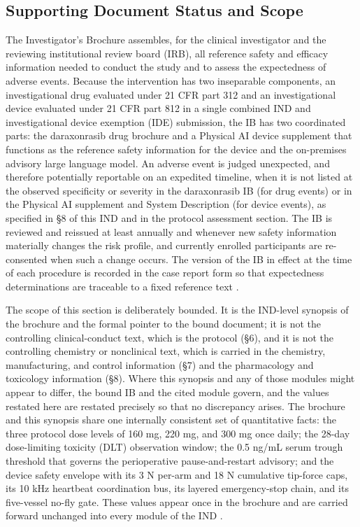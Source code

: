 \subsection*{Supporting Document Status and Scope}

The Investigator's Brochure assembles, for the clinical investigator and the
reviewing institutional review board (IRB), all reference safety and efficacy
information needed to conduct the study and to assess the expectedness of adverse
events. Because the intervention has two inseparable components, an investigational
drug evaluated under 21 CFR part 312 and an investigational device evaluated under
21 CFR part 812 in a single combined IND and investigational device exemption (IDE)
submission, the IB has two coordinated parts: the daraxonrasib drug brochure and a
Physical AI device supplement that functions as the reference safety information for
the device and the on-premises advisory large language model. An adverse event is
judged unexpected, and therefore potentially reportable on an expedited timeline,
when it is not listed at the observed specificity or severity in the daraxonrasib
IB (for drug events) or in the Physical AI supplement and System Description (for
device events), as specified in \S 8 of this IND and in the protocol assessment
section. The IB is reviewed and reissued at least annually and whenever new safety
information materially changes the risk profile, and currently enrolled
participants are re-consented when such a change occurs. The version of the IB in
effect at the time of each procedure is recorded in the case report form so that
expectedness determinations are traceable to a fixed reference text
\cite{daraxwhipple,cfr312paiuni}.

The scope of this section is deliberately bounded. It is the IND-level synopsis
of the brochure and the formal pointer to the bound document; it is not the
controlling clinical-conduct text, which is the protocol (\S 6), and it is not the
controlling chemistry or nonclinical text, which is carried in the chemistry,
manufacturing, and control information (\S 7) and the pharmacology and toxicology
information (\S 8). Where this synopsis and any of those modules might appear to
differ, the bound IB and the cited module govern, and the values restated here are
restated precisely so that no discrepancy arises. The brochure and this synopsis
share one internally consistent set of quantitative facts: the three protocol dose
levels of 160 mg, 220 mg, and 300 mg once daily; the 28-day dose-limiting toxicity
(DLT) observation window; the 0.5 ng/mL serum trough threshold that governs the
perioperative pause-and-restart advisory; and the device safety envelope with its
3 N per-arm and 18 N cumulative tip-force caps, its 10 kHz heartbeat coordination
bus, its layered emergency-stop chain, and its five-vessel no-fly gate. These
values appear once in the brochure and are carried forward unchanged into every
module of the IND \cite{daraxwhipple,onpremwhippl}.

